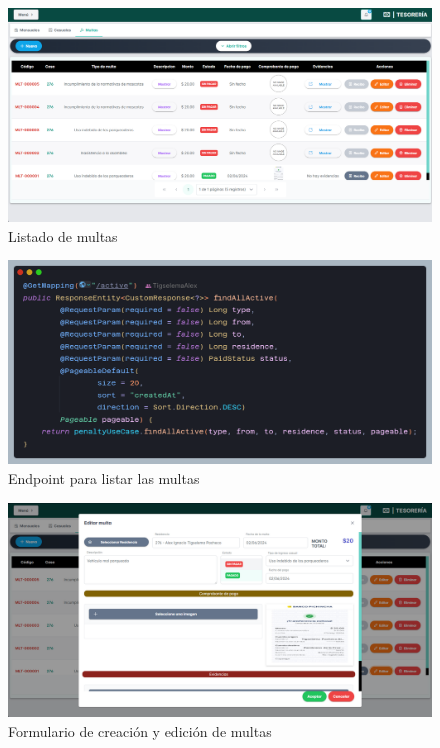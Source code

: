 \begin{figure}[H]
    \centering
    \includegraphics[width=1\textwidth]{resources/images/sw-tesoreria-multas-listar}
    \caption{Listado de multas}
    \label{fig:sw-tesoreria-multa-listar}
\end{figure}

\begin{figure}[H]
    \centering
    \includegraphics[width=1\textwidth]{resources/images/api-multas-listar}
    \caption{Endpoint para listar las multas}
    \label{fig:api-tesoreria-multa'listar}
\end{figure}

\begin{figure}[H]
    \centering
    \includegraphics[width=1\textwidth]{resources/images/sw-tesoreria-multas-form}
    \caption{Formulario de creación y edición de multas}
    \label{fig:sw-tesoreria-multa-form}
\end{figure}



